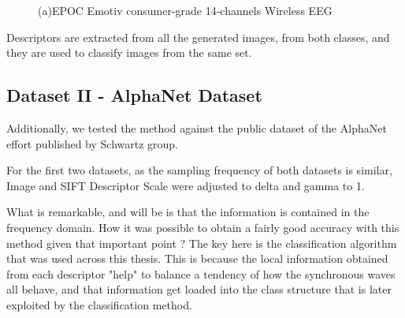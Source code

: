 \begin{figure}[h!]
\centering
{}
\caption[EPOC Emotiv Alpha Waves Dataset]{(a)EPOC Emotiv consumer-grade 14-channels Wireless EEG}
\label{fig:alpharesults}
\end{figure}

Descriptors are extracted from all the generated images, from both classes, and they are used to classify images from the same set.       
      
\subsection{Dataset II - AlphaNet Dataset}
Additionally, we tested the method against the public dataset of the AlphaNet effort published by Schwartz group.


For the first two datasets, as the sampling frequency of both datasets is similar, Image and SIFT Descriptor Scale were adjusted to delta and gamma to 1.

What is remarkable, and will be is that the information is contained in the frequency domain.  How it was possible to obtain a fairly good accuracy with this method given that important point ?  The key here is the classification algorithm that was used across this thesis.  This is because the local information obtained from each descriptor "help" to balance a tendency of how the synchronous waves all behave, and that information get loaded into the class structure that is later exploited by the classification method.

